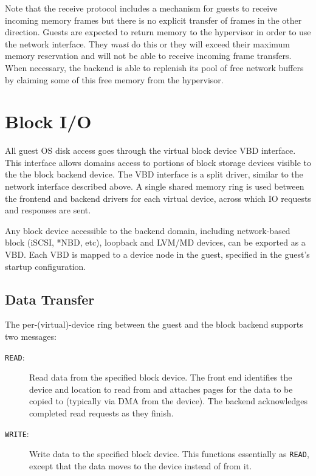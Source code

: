 \documentclass[11pt,twoside,final,openright]{report}
\begin{document}
Note that the receive protocol includes a mechanism for guests to
receive incoming memory frames but there is no explicit transfer of
frames in the other direction.  Guests are expected to return memory
to the hypervisor in order to use the network interface.  They {\em
must} do this or they will exceed their maximum memory reservation and
will not be able to receive incoming frame transfers.  When necessary,
the backend is able to replenish its pool of free network buffers by
claiming some of this free memory from the hypervisor.

\section{Block I/O}

All guest OS disk access goes through the virtual block device VBD
interface.  This interface allows domains access to portions of block
storage devices visible to the the block backend device.  The VBD
interface is a split driver, similar to the network interface
described above.  A single shared memory ring is used between the
frontend and backend drivers for each virtual device, across which
IO requests and responses are sent.

Any block device accessible to the backend domain, including
network-based block (iSCSI, *NBD, etc), loopback and LVM/MD devices,
can be exported as a VBD.  Each VBD is mapped to a device node in the
guest, specified in the guest's startup configuration.

\subsection{Data Transfer}

The per-(virtual)-device ring between the guest and the block backend
supports two messages:

\begin{description}
\item [{\small {\tt READ}}:] Read data from the specified block
  device.  The front end identifies the device and location to read
  from and attaches pages for the data to be copied to (typically via
  DMA from the device).  The backend acknowledges completed read
  requests as they finish.

\item [{\small {\tt WRITE}}:] Write data to the specified block
  device.  This functions essentially as {\small {\tt READ}}, except
  that the data moves to the device instead of from it.
\end{description}
\end{document}
